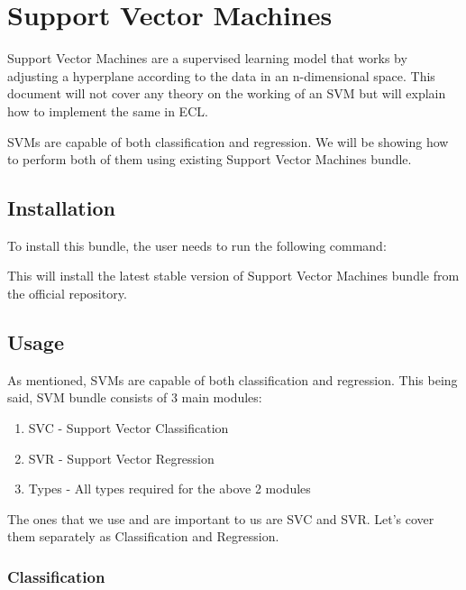 
\chapter{Support Vector Machines}\label{supe:svm}

Support Vector Machines are a supervised learning model that works by adjusting a hyperplane according to the data in an n-dimensional space. This document will not cover any theory on the working of an SVM but will explain how to implement the same in ECL. 

SVMs are capable of both classification and regression. We will be showing how to perform both of them using existing Support Vector Machines bundle.

\section{Installation}

To install this bundle, the user needs to run the following command:



This will install the latest stable version of Support Vector Machines bundle from the official repository.

\section{Usage}

As mentioned, SVMs are capable of both classification and regression. This being said, SVM bundle consists of 3 main modules:

\begin{enumerate}
    \item SVC - Support Vector Classification
    \item SVR - Support Vector Regression
    \item Types - All types required for the above 2 modules
\end{enumerate}

The ones that we use and are important to us are SVC and SVR. Let's cover them separately as Classification and Regression.

\pagebreak

\subsection{Classification}


